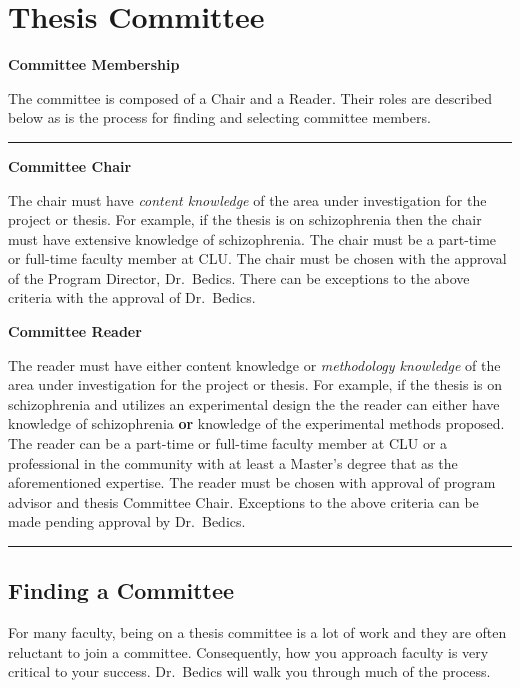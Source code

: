 \documentclass[openany]{book}
\begin{document}
\hypertarget{thesis-committee}{%
\chapter{Thesis Committee}\label{thesis-committee}}

\textbf{Committee Membership}

The committee is composed of a Chair and a Reader. Their roles are described below as is the process for finding and selecting committee members.

\begin{center}\rule{0.5\linewidth}{0.5pt}\end{center}

\textbf{Committee Chair}

The chair must have \emph{content knowledge} of the area under investigation for the project or thesis. For example, if the thesis is on schizophrenia then the chair must have extensive knowledge of schizophrenia. The chair must be a part-time or full-time faculty member at CLU. The chair must be chosen with the approval of the Program Director, Dr.~Bedics. There can be exceptions to the above criteria with the approval of Dr.~Bedics.

\textbf{Committee Reader}

The reader must have either content knowledge or \emph{methodology knowledge} of the area under investigation for the project or thesis. For example, if the thesis is on schizophrenia and utilizes an experimental design the the reader can either have knowledge of schizophrenia \textbf{or} knowledge of the experimental methods proposed. The reader can be a part-time or full-time faculty member at CLU or a professional in the community with at least a Master's degree that as the aforementioned expertise. The reader must be chosen with approval of program advisor and thesis Committee Chair. Exceptions to the above criteria can be made pending approval by Dr.~Bedics.

\begin{center}\rule{0.5\linewidth}{0.5pt}\end{center}

\hypertarget{finding-a-committee}{%
\section{Finding a Committee}\label{finding-a-committee}}

For many faculty, being on a thesis committee is a lot of work and they are often reluctant to join a committee. Consequently, how you approach faculty is very critical to your success. Dr.~Bedics will walk you through much of the process.
\end{document}
